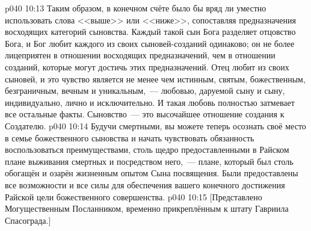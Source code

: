 \vs p040 10:13 \pc Таким образом, в конечном счёте было бы вряд ли уместно использовать слова <<выше>> или <<ниже>>, сопоставляя предназначения восходящих категорий сыновства. Каждый такой сын Бога разделяет отцовство Бога, и Бог любит каждого из своих сыновей-созданий одинаково; он не более лицеприятен в отношении восходящих предназначений, чем в отношении созданий, которые могут достичь этих предназначений. Отец любит  из своих сыновей, и это чувство является не менее чем истинным, святым, божественным, безграничным, вечным и уникальным,~--- любовью, даруемой  сыну и  сыну, индивидуально, лично и исключительно. И такая любовь полностью затмевает все остальные факты. Сыновство~--- это высочайшее отношение создания к Создателю.
\vs p040 10:14 Будучи смертными, вы можете теперь осознать своё место в семье божественного сыновства и начать чувствовать обязанность воспользоваться преимуществами, столь щедро предоставленными в Райском плане выживания смертных и посредством него,~--- плане, который был столь обогащён и озарён жизненным опытом Сына посвящения. Были предоставлены все возможности и все силы для обеспечения вашего конечного достижения Райской цели божественного совершенства.
\vsetoff
\vs p040 10:15 [Представлено Могущественным Посланником, временно прикреплённым к штату Гавриила Спасограда.]
\quizlink
